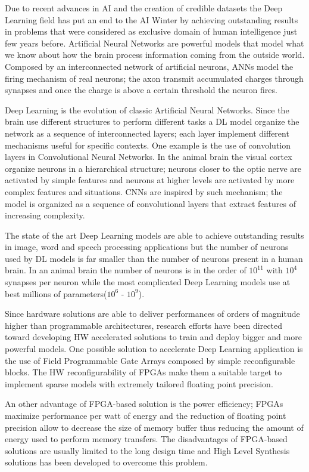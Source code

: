 \documentclass[../main.tex]{subfiles}
\begin{document}
Due to recent advances in AI and the creation of credible datasets the Deep Learning field has put an end to the AI Winter by achieving outstanding results in problems that were considered as exclusive domain of human intelligence just few years before.
Artificial Neural Networks are powerful models that model what we know about how the brain process information coming from the outside world. 
Composed by an interconnected network of artificial neurons, ANNs model the firing mechanism of real neurons; the axon transmit accumulated charges through synapses and once the charge is above a certain threshold the neuron fires.

Deep Learning is the evolution of classic Artificial Neural Networks. 
Since the brain use different structures to perform different tasks a DL model organize the network as a sequence of interconnected layers; each layer implement different mechanisms useful for specific contexts.
One example is the use of convolution layers in Convolutional Neural Networks.
In the animal brain the visual cortex organize neurons in a hierarchical structure; neurons closer to the optic nerve are activated by simple features and neurons at higher levels are activated by more complex features and situations.
CNNs are inspired by such mechanism; the model is organized as a sequence of convolutional layers that extract features of increasing complexity.

The state of the art Deep Learning models are able to achieve outstanding results in image, word and speech processing applications but the number of neurons used by DL models is far smaller than the number of neurons present in a human brain.
In an animal brain the number of neurons is in the order of $10^{11}$ with $10^4$ synapses per neuron while the most complicated Deep Learning models use at best millions of parameters($10^6$ - $10^9$).

Since hardware solutions are able to deliver performances of orders of magnitude higher than programmable architectures, research efforts have been directed toward developing HW accelerated solutions to train and deploy bigger and more powerful models.
One possible solution to accelerate Deep Learning application is the use of Field Programmable Gate Arrays composed by simple reconfigurable blocks.
The HW reconfigurability of FPGAs make them a suitable target to implement sparse models with extremely tailored floating point precision.

An other advantage of FPGA-based solution is the power efficiency; FPGAs maximize performance per watt of energy and the reduction of floating point precision allow to decrease the size of memory buffer thus reducing the amount of energy used to perform memory transfers.
The disadvantages of FPGA-based solutions are usually limited to the long design time and High Level Synthesis solutions has been developed to overcome this problem.
\end{document}

